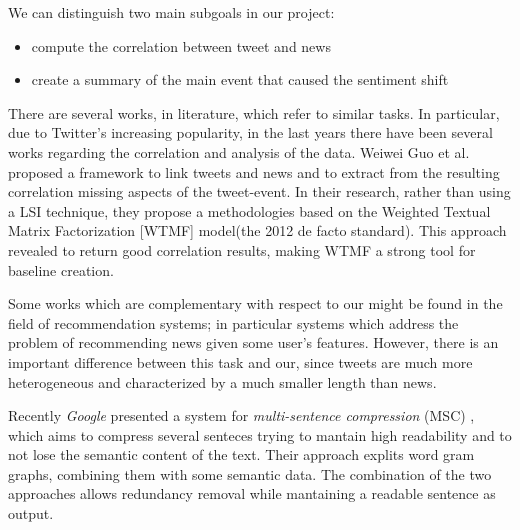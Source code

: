 We can distinguish two main subgoals in our project:
\begin{itemize}
	\item compute the correlation between tweet and news
	\item create a summary of the main event that caused the sentiment shift
\end{itemize}
There are several works, in literature, which refer to similar tasks. 
In particular, due to Twitter's increasing popularity, in the last years there
have been several works regarding the correlation and analysis of the data.
Weiwei Guo et al.\cite{LTN} proposed a framework to link tweets and news and to
extract from the resulting correlation missing aspects of the tweet-event. 
In their research, rather than using a LSI technique, they propose a
methodologies based on the Weighted Textual Matrix Factorization\cite{WTMF}
[WTMF] model(the 2012 de facto standard). This approach revealed to return
good correlation results, making WTMF a strong tool for baseline creation.

Some works which are complementary with respect to our might be found in the
field of recommendation systems; in particular systems which address the
problem of recommending news given some user's features. However, there is an
important difference between this task and our, since tweets are much more
heterogeneous and characterized by a much smaller length than news.

Recently \emph{Google} presented a system for \emph{multi-sentence compression} (MSC) \cite{MSC}, which aims
to compress several senteces trying to mantain high readability and to not lose
the semantic content of the text. Their approach explits word gram graphs,
combining them with some semantic data. The combination of the two approaches
allows redundancy removal while mantaining a readable sentence as output.


